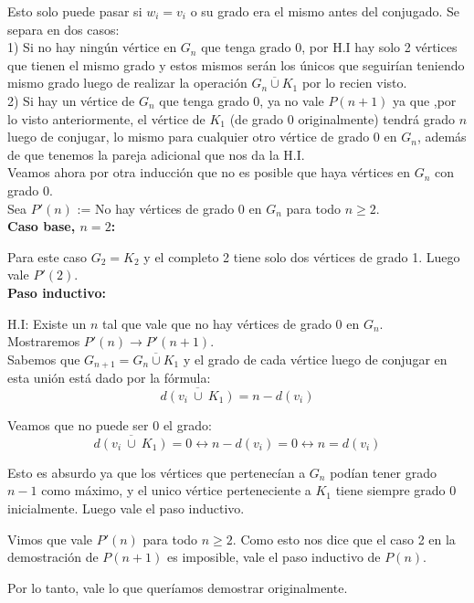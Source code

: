 \documentclass{article}
\begin{document}
Esto solo puede pasar si $w_i = v_i$ o su grado era el mismo antes del conjugado. Se separa en dos casos:\\

1) Si no hay ningún vértice en $G_n$ que tenga grado 0, por H.I hay solo 2 vértices que tienen el mismo grado y estos mismos serán los únicos que seguirían teniendo mismo grado luego de realizar la operación $\overline{G_n \cup K_1}$ por lo recien visto. \\

2) Si hay un vértice de $G_n$ que tenga grado 0, ya no vale $P(n + 1)$ ya que ,por lo visto anteriormente, el vértice de $K_1$ (de grado 0 originalmente) tendrá grado $n$ luego de conjugar, lo mismo para cualquier otro vértice de grado 0 en $G_n$, además de que tenemos la pareja adicional que nos da la H.I.\\

Veamos ahora por otra inducción que no es posible que haya vértices en $G_n$ con grado 0.\\

Sea $P'(n)$ := No hay vértices de grado 0 en $G_n$ para todo $n \geq 2$.\\

\textbf{Caso base, $n = 2$:}

Para este caso $G_2 = K_2$ y el completo 2 tiene solo dos vértices de grado 1. Luego vale $P'(2)$.\\

\textbf{Paso inductivo:}

H.I: Existe un $n$ tal que vale que no hay vértices de grado 0 en $G_n$. \\ 
Mostraremos $P'(n) \rightarrow P'(n+1)$.\\

Sabemos que $G_{n+1} = \overline{G_n \cup K_1}$ y el grado de cada vértice luego de conjugar en esta unión está dado por la fórmula:
\[ \overline{d(v_i \ \cup\  K_1)} =  n - d(v_i) \]

Veamos que no puede ser 0 el grado:
\[ \overline{d(v_i \ \cup\  K_1)}  = 0 \leftrightarrow n - d(v_i) = 0 \leftrightarrow n = d(v_i) \]

Esto es absurdo ya que los vértices que pertenecían a $G_n$ podían tener grado $n-1$ como máximo, y el unico vértice  perteneciente a $K_1$ tiene siempre grado 0 inicialmente. Luego vale el paso inductivo.

Vimos que vale $P'(n)$ para todo $n \geq 2$. Como esto nos dice que el caso 2 en la demostración de $P(n+1)$ es imposible, vale el paso inductivo de $P(n)$.

Por lo tanto, vale lo que queríamos demostrar originalmente.
\end{document}
